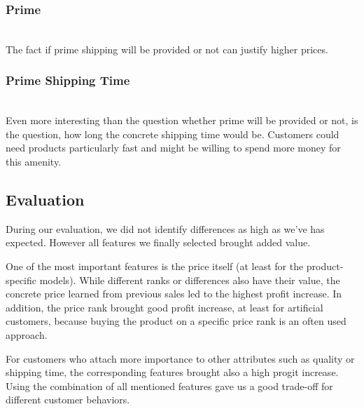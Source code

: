 	\subsubsection{Prime}
		~\\
		The fact if prime shipping will be provided or not can justify higher prices.
	\subsubsection{Prime Shipping Time}
		~\\
		Even more interesting than the question whether prime will be provided or not, is the question, how long the concrete shipping time would be. Customers could need products particularly fast and might be willing to spend more money for this amenity.
\subsection{Evaluation}
	During our evaluation, we did not identify differences as high as we've has expected. However all features we finally selected brought added value.

	One of the most important features is the price itself (at least for the product-specific models). While different ranks or differences also have their value, the concrete price learned from previous sales led to the highest profit increase. In addition, the price rank brought good profit increase, at least for artificial customers, because buying the product on a specific price rank is an often used approach.

	For customers who attach more importance to other attributes such as quality or shipping time, the corresponding features brought also a high progit increase. Using the combination of all mentioned features gave us a good trade-off for different customer behaviors.
